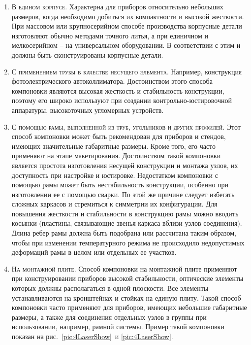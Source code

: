 \begin{enumerate}
	\item \textsc{В едином корпусе}. 
	Характерна для приборов относительно небольших размеров, когда необходимо добиться их компактности и высокой жесткости. 
	При массовом или крупносерийном способе производства корпусные детали изготовляют обычно методами точного литья, а при единичном и мелкосерийном -- на универсальном оборудовании. 
	В соответствии с этим и должны быть сконструированы корпусные детали.
	
	\item \textsc{С применением трубы в качестве несущего элемента}. Например, конструкция фотоэлектрического автоколлиматора. 
	Достоинством этого способа компоновки являются высокая жесткость и стабильность конструкции, поэтому его широко используют при создании контрольно-юстировочной аппаратуры, высокоточных угломерных устройств.
	
	\item \textsc{С помощью рамы, выполненной из труб, угольников и других профилей}. 
	Этот способ компоновки может быть рекомендован для приборов и стендов, имеющих значительные габаритные размеры. 
	Кроме того, его часто применяют на этапе макетирования. 
	Достоинством такой компоновки является простота изготовления несущей конструкции и монтажа узлов, их доступность при настройке и юстировке. Недостатком компоновки с помощью рамы может быть нестабильность конструкции, особенно при изготовлении ее с помощью сварки. 
	По этой же причине следует избегать сложных каркасов и стремиться к симметрии их конфигурации. 
	Для повышения жесткости и стабильности в конструкцию рамы можно вводить косынки (пластины, связывающие звенья каркаса вблизи узлов соединения). Длина ребер рамы должна быть подобрана или рассчитана таким образом, чтобы при изменении температурного режима не происходило недопустимых деформаций рамы в целом или отдельных ее участков.
	
	\item \textsc{На монтажной плите}. 
	Способ компоновки на монтажной плите применяют при конструировании приборов высокой стабильности, оптические элементы которых должны располагаться в одной плоскости. Все элементы устанавливаются на кронштейнах и стойках на единую плиту. 
	Такой способ компоновки часто применяют для приборов, имеющих небольшие габаритные размеры, а также для соединения отдельных узлов в группы при использовании, например, рамной системы. 
	Пример такой компоновки показан на рис.~\ref{pic:4LaserShow}~и \ref{pic:4LaserShow}.
	

\end{enumerate}
